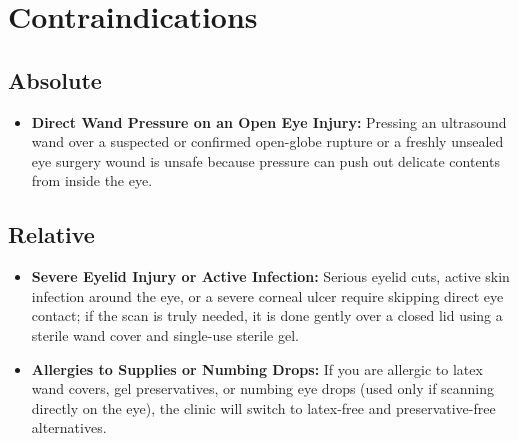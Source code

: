 \section{Contraindications}

\subsection{Absolute}
\begin{itemize}
    \item \textbf{Direct Wand Pressure on an Open Eye Injury:} Pressing an ultrasound wand over a suspected or confirmed open-globe rupture or a freshly unsealed eye surgery wound is unsafe because pressure can push out delicate contents from inside the eye.
\end{itemize}

\subsection{Relative}
\begin{itemize}
    \item \textbf{Severe Eyelid Injury or Active Infection:} Serious eyelid cuts, active skin infection around the eye, or a severe corneal ulcer require skipping direct eye contact; if the scan is truly needed, it is done gently over a closed lid using a sterile wand cover and single-use sterile gel.
    \item \textbf{Allergies to Supplies or Numbing Drops:} If you are allergic to latex wand covers, gel preservatives, or numbing eye drops (used only if scanning directly on the eye), the clinic will switch to latex-free and preservative-free alternatives.
\end{itemize}


